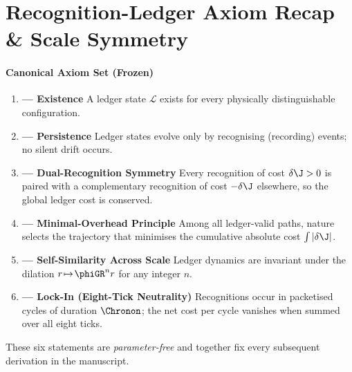 \documentclass[11pt,oneside]{book}
\begin{document}
{%

\section{Recognition-Ledger Axiom Recap \& Scale Symmetry}
\label{sec:axiom-recap-scale}

\paragraph{Canonical Axiom Set (Frozen)}

\begin{enumerate}\setlength\itemsep{4pt}
\item \textbf{ — Existence}  
      A ledger state \(\mathcal{L}\) exists for every physically
      distinguishable configuration.

\item \textbf{ — Persistence}  
      Ledger states evolve only by recognising (recording) events; no
      silent drift occurs.

\item \textbf{ — Dual-Recognition Symmetry}  
      Every recognition of cost \(\delta\J>0\) is paired with a
      complementary recognition of cost \(-\delta\J\) elsewhere, so the
      global ledger cost is conserved.

\item \textbf{ — Minimal-Overhead Principle}  
      Among all ledger-valid paths, nature selects the trajectory that
      minimises the cumulative absolute cost
      \(
         \int|\delta\J|
      \).

\item \textbf{ — Self-Similarity Across Scale}  
      Ledger dynamics are invariant under the dilation
      \(r\!\mapsto\!\phiGR^{n}r\) for any integer \(n\).

\item \textbf{ — Lock-In (Eight-Tick Neutrality)}  
      Recognitions occur in packetised cycles of duration
      \(\Chronon\); the net cost per cycle vanishes when summed over
      all eight ticks.
\end{enumerate}

These six statements are \emph{parameter-free} and together fix every
subsequent derivation in the manuscript.

}
\end{document}
